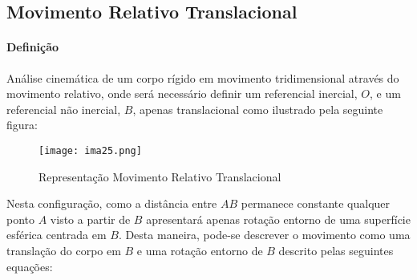 \documentclass{article}
\begin{document}
        \subsection{Movimento Relativo Translacional}
            \paragraph{Definição}Análise cinemática de um corpo rígido em movimento tridimensional através do movimento relativo, onde será necessário definir um referencial inercial, $O$, e um referencial não inercial, $B$, apenas translacional como ilustrado pela seguinte figura:
                \begin{figure}[H]
                    \centering
                    \texttt{[image: ima25.png]}
                    \caption{Representação Movimento Relativo Translacional}
                \end{figure}\noindent
            Nesta configuração, como a distância entre $AB$ permanece constante qualquer ponto $A$ visto a partir de $B$ apresentará apenas rotação entorno de uma superfície esférica centrada em $B$. Desta maneira, pode-se descrever o movimento como uma translação do corpo em $B$ e uma rotação entorno de $B$ descrito pelas seguintes equações:
\end{document}
